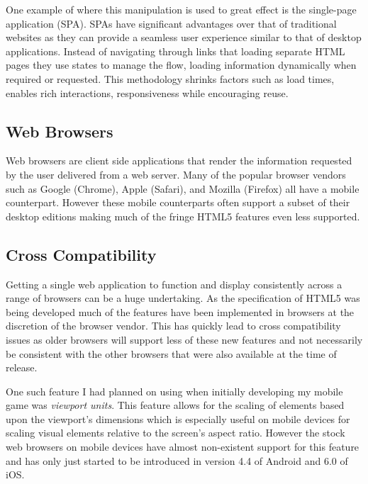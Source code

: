 \documentclass[final]{cmpreport}
\begin{document}
One example of where this manipulation is used to great effect is the single-page application (SPA). SPAs have significant advantages over that of traditional websites as they can provide a seamless user experience similar to that of desktop applications. Instead of navigating through links that loading separate HTML pages they use states to manage the flow, loading information dynamically when required or requested. This methodology shrinks factors such as load times, enables rich interactions, responsiveness while encouraging reuse. \citep{Takada}

\subsection{Web Browsers}
Web browsers are client side applications that render the information requested by the user delivered from a web server. Many of the popular browser vendors such as Google (Chrome), Apple (Safari), and Mozilla (Firefox) all have a mobile counterpart. However these mobile counterparts often support a subset of their desktop editions making much of the fringe HTML5 features even less supported.

\subsection{Cross Compatibility}
Getting a single web application to function and display consistently across a range of browsers can be a huge undertaking. As the specification of HTML5 was being developed much of the features have been implemented in browsers at the discretion of the browser vendor. This has quickly lead to cross compatibility issues as older browsers will support less of these new features and not necessarily be consistent with the other browsers that were also available at the time of release.

One such feature I had planned on using when initially developing my mobile game was \textit{viewport units}. This feature allows for the scaling of elements based upon the viewport's dimensions which is especially useful on mobile devices for scaling visual elements relative to the screen's aspect ratio. However the stock web browsers on mobile devices have almost non-existent support for this feature and has only just started to be introduced in version 4.4 of Android and 6.0 of iOS.
\end{document}
